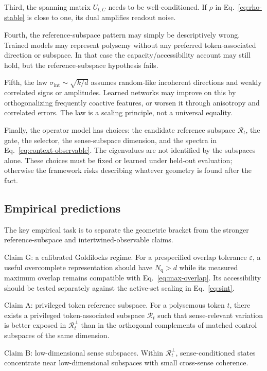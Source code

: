 \documentclass[
  aps,
  reprint,
  superscriptaddress,
  floatfix,
  nofootinbib,
  longbibliography
]{revtex4-2}
\newcommand{\Nq}{N_{\mathrm q}}
\newcommand{\sint}{\sigma_{\mathrm{int}}}
\begin{document}
Third, the spanning matrix $U_{t,C}$ needs to be well-conditioned. If
$\rho$ in Eq.~\eqref{eq:rho-stable} is close to one, its dual amplifies
readout noise.

Fourth, the reference-subspace pattern may simply be descriptively wrong. Trained
models may represent polysemy without any preferred token-associated
direction or subspace. In that case the capacity/accessibility
account may still hold, but the reference-subspace hypothesis fails.

Fifth, the law $\sint\sim\sqrt{k/d}$ assumes random-like
incoherent directions and weakly correlated signs or amplitudes.
Learned networks may improve on this by orthogonalizing frequently
coactive features, or worsen it through anisotropy and correlated
errors. The law is a scaling principle, not a universal equality.

Finally, the operator model has choices: the candidate reference subspace
$\mathcal R_t$, the gate, the selector, the sense-subspace dimension, and the
spectra in Eq.~\eqref{eq:context-observable}.  The eigenvalues are not
identified by the subspaces alone. These choices must be fixed or learned
under held-out evaluation; otherwise the framework risks describing whatever
geometry is found after the fact.

\subsection{Empirical predictions}
\label{sec:predictions}

The key empirical task is to separate the geometric bracket from the stronger
reference-subspace and intertwined-observable claims.

{Claim G: a calibrated Goldilocks regime.}
For a prespecified overlap tolerance $\varepsilon$, a useful overcomplete
representation should have $\Nq>d$ while its measured maximum overlap remains
compatible with Eq.~\eqref{eq:max-overlap}. Its accessibility should be tested
separately against the active-set scaling in Eq.~\eqref{eq:sint}.

{Claim A: privileged token reference subspace.}
For a polysemous token $t$, there exists a privileged token-associated
subspace $\mathcal R_t$ such that sense-relevant variation is better
exposed in $\mathcal R_t^\perp$ than in the orthogonal complements of
matched control subspaces of the same dimension.

{Claim B: low-dimensional sense subspaces.}
Within $\mathcal R_t^\perp$,
sense-conditioned states concentrate near low-dimensional subspaces
with small cross-sense coherence.
\end{document}
